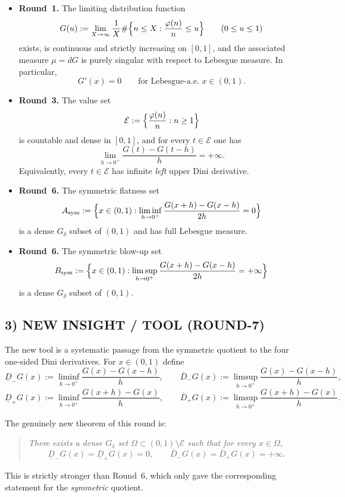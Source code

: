 \begin{itemize}
\item \textbf{Round~1.} The limiting distribution function
\[
G(u):=\lim_{X\to\infty}\frac1X\#\Bigl\{n\le X:\frac{\varphi(n)}n\le u\Bigr\}
\qquad(0\le u\le1)
\]
exists, is continuous and strictly increasing on $[0,1]$, and the associated measure $\mu=dG$ is purely singular with respect to Lebesgue measure.
In particular,
\[
G'(x)=0\qquad\text{for Lebesgue-a.e. }x\in(0,1).
\]

\item \textbf{Round~3.} The value set
\[
\mathcal E:=\Bigl\{\frac{\varphi(n)}{n}:n\ge1\Bigr\}
\]
is countable and dense in $[0,1]$, and for every $t\in\mathcal E$ one has
\[
\lim_{h\to0^+}\frac{G(t)-G(t-h)}{h}=+\infty.
\]
Equivalently, every $t\in\mathcal E$ has infinite \emph{left} upper Dini derivative.

\item \textbf{Round~6.} The symmetric flatness set
\[
A_{\rm sym}:=\Bigl\{x\in(0,1):\liminf_{h\to0^+}\frac{G(x+h)-G(x-h)}{2h}=0\Bigr\}
\]
is a dense $G_\delta$ subset of $(0,1)$ and has full Lebesgue measure.

\item \textbf{Round~6.} The symmetric blow-up set
\[
B_{\rm sym}:=\Bigl\{x\in(0,1):\limsup_{h\to0^+}\frac{G(x+h)-G(x-h)}{2h}=+\infty\Bigr\}
\]
is a dense $G_\delta$ subset of $(0,1)$.
\end{itemize}

\subsection{3) NEW INSIGHT / TOOL (ROUND-7)}

The new tool is a systematic passage from the symmetric quotient to the four one-sided Dini derivatives.
For $x\in(0,1)$ define
\[
\underline D_-G(x):=\liminf_{h\to0^+}\frac{G(x)-G(x-h)}{h},
\qquad
\overline D_-G(x):=\limsup_{h\to0^+}\frac{G(x)-G(x-h)}{h},
\]
\[
\underline D_+G(x):=\liminf_{h\to0^+}\frac{G(x+h)-G(x)}{h},
\qquad
\overline D_+G(x):=\limsup_{h\to0^+}\frac{G(x+h)-G(x)}{h}.
\]

The genuinely new theorem of this round is:
\begin{quote}
\emph{There exists a dense $G_\delta$ set $\Omega\subset(0,1)\setminus\mathcal E$ such that for every $x\in\Omega$,}
\[
\underline D_-G(x)=\underline D_+G(x)=0,
\qquad
\overline D_-G(x)=\overline D_+G(x)=+\infty.
\]
\end{quote}

This is strictly stronger than Round~6, which only gave the corresponding statement for the \emph{symmetric} quotient.

